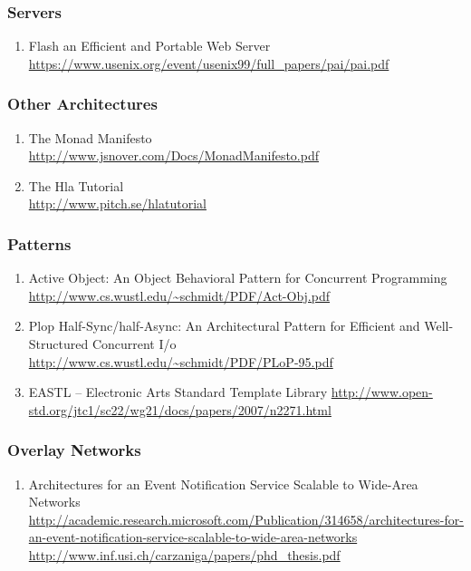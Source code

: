 \documentclass{article}
\begin{document}
\subsubsection{Servers}
\begin{enumerate}
	\item {Flash an Efficient and Portable Web Server\\
\url{https://www.usenix.org/event/usenix99/full_papers/pai/pai.pdf}}
\end{enumerate}

\subsubsection{Other Architectures}
\begin{enumerate}
	\item {The Monad Manifesto\\
\url{http://www.jsnover.com/Docs/MonadManifesto.pdf}}
	\item {The Hla Tutorial\\
\url{http://www.pitch.se/hlatutorial}}
\end{enumerate}

\subsubsection{Patterns}
\begin{enumerate}
	\item {Active Object: An Object Behavioral Pattern for Concurrent Programming\\
\url{http://www.cs.wustl.edu/~schmidt/PDF/Act-Obj.pdf}}
	\item {Plop Half-Sync/half-Async: An Architectural Pattern for Efficient and Well-Structured Concurrent I/o\\
\url{http://www.cs.wustl.edu/~schmidt/PDF/PLoP-95.pdf}}
	\item{EASTL -- Electronic Arts Standard Template Library \url{http://www.open-std.org/jtc1/sc22/wg21/docs/papers/2007/n2271.html}}
\end{enumerate}

\subsubsection{Overlay Networks}
\begin{enumerate}
	\item {Architectures for an Event Notification Service Scalable to Wide-Area Networks\\
\href{http://academic.research.microsoft.com/Publication/314658/architectures-for-an-event-notification-service-scalable-to-wide-area-networks}{http://academic.research.microsoft.com/Publication/314658/architectures-for-an-event-notification-service-scalable-to-wide-area-networks}\\
\url{http://www.inf.usi.ch/carzaniga/papers/phd_thesis.pdf}}
\end{enumerate}
\end{document}
